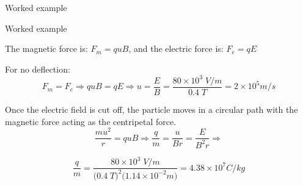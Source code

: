 {\begin{frame}{Worked example}
\end{frame}

%
%
%

\begin{frame}{Worked example}

The magnetic force is: $\displaystyle   F_m = q u B $,
and the electric force is:  $\displaystyle  F_e = q E $\\
\vspace{0.2cm}

For no deflection:
\begin{equation*}
   F_m = F_e  \Rightarrow
   quB = qE  \Rightarrow
    u = \frac{E}{B} =
      \frac{80 \times 10^3 \; V/m}{0.4 \; T} = 2 \times 10^5 m/s
\end{equation*}

Once the electric field is cut off,
the particle moves in a circular path with
the magnetic force acting as the centripetal force.
\begin{equation*}
   \frac{mu^2}{r} = quB  \Rightarrow
    \frac{q}{m} = \frac{u}{Br} = \frac{E}{B^2 r}  \Rightarrow
\end{equation*}

\begin{equation*}
   \frac{q}{m} =
       \frac{80 \times 10^3 \; V/m}{\Big( 0.4 \; T\Big)^2 \Big( 1.14 \times 10^{-2} m\Big)} =
       4.38 \times 10^{7} C/kg
\end{equation*}

\end{frame}


} %



%
%
%

